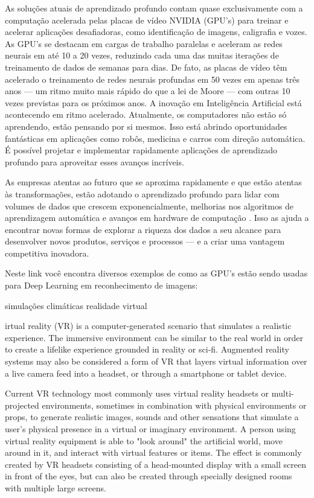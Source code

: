 As soluções atuais de aprendizado profundo contam quase exclusivamente com a computação acelerada pelas placas de vídeo NVIDIA (GPU’s) para treinar e acelerar aplicações desafiadoras, como identificação de imagens, caligrafia e vozes. As GPU’s se destacam em cargas de trabalho paralelas e aceleram as redes neurais em até 10 a 20 vezes, reduzindo cada uma das muitas iterações de treinamento de dados de semanas para dias. De fato, as placas de vídeo têm acelerado o treinamento de redes neurais profundas em 50 vezes em apenas três anos — um ritmo muito mais rápido do que a lei de Moore — com outras 10 vezes previstas para os próximos anos. A inovação em Inteligência Artificial está acontecendo em ritmo acelerado. Atualmente, os computadores não estão só aprendendo, estão pensando por si mesmos. Isso está abrindo oportunidades fantásticas em aplicações como robôs, medicina e carros com direção automática. É possível projetar e implementar rapidamente aplicações de aprendizado profundo para aproveitar esses avanços incríveis.

As empresas atentas ao futuro que se aproxima rapidamente e que estão atentas às transformações, estão adotando o aprendizado profundo para lidar com volumes de dados que crescem exponencialmente, melhorias nos algoritmos de aprendizagem automática e avanços em hardware de computação . Isso as ajuda a encontrar novas formas de explorar a riqueza dos dados a seu alcance para desenvolver novos produtos, serviços e processos — e a criar uma vantagem competitiva inovadora.

Neste link você encontra diversos exemplos de como as GPU’s estão sendo usadas para Deep Learning em reconhecimento de imagens:

simulações climáticas
realidade virtual

irtual reality (VR) is a computer-generated scenario that simulates a realistic experience. The immersive environment can be similar to the real world in order to create a lifelike experience grounded in reality or sci-fi. Augmented reality systems may also be considered a form of VR that layers virtual information over a live camera feed into a headset, or through a smartphone or tablet device.

Current VR technology most commonly uses virtual reality headsets or multi-projected environments, sometimes in combination with physical environments or props, to generate realistic images, sounds and other sensations that simulate a user's physical presence in a virtual or imaginary environment. A person using virtual reality equipment is able to "look around" the artificial world, move around in it, and interact with virtual features or items. The effect is commonly created by VR headsets consisting of a head-mounted display with a small screen in front of the eyes, but can also be created through specially designed rooms with multiple large screens.


